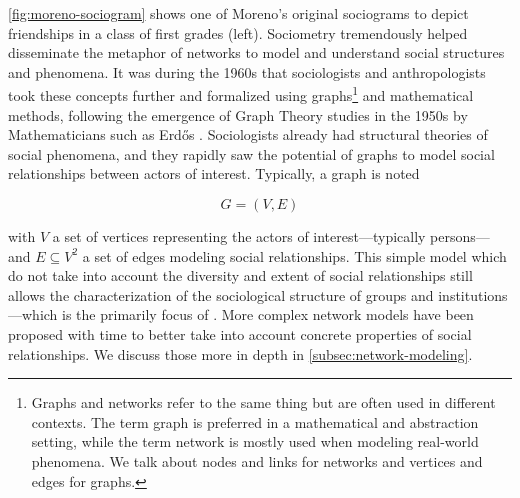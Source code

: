 \autoref{fig:moreno-sociogram} shows one of Moreno's original sociograms to depict friendships in a class of first grades (left).
Sociometry tremendously helped disseminate the metaphor of networks to model and understand social structures and phenomena.
It was during the 1960s that sociologists and anthropologists took these concepts further and formalized \sna using graphs\footnote{Graphs and networks refer to the same thing but are often used in different contexts. The term graph is preferred in a mathematical and abstraction setting, while the term network is mostly used when modeling real-world phenomena. We talk about nodes and links for networks and vertices and edges for graphs.} and mathematical methods\cite{cConceptUseSocial1969, freemanDevelopmentSocialNetwork2004}, following the emergence of Graph Theory studies in the 1950s by Mathematicians such as Erd\H{o}s \cite{erdos2011}.
Sociologists already had structural theories of social phenomena, and they rapidly saw the potential of graphs to model social relationships between actors of interest.
Typically, a graph is noted

\begin{equation}
    G = (V, E)\label{eq:graph}
\end{equation}

with $V$ a set of vertices representing the actors of interest---typically persons---and $E \subseteq V^2$ a set of edges modeling social relationships.
This simple model which do not take into account the diversity and extent of social relationships still allows the characterization of the sociological structure of groups and institutions---which is the primarily focus of \sna\cite{scottSocialNetworkAnalysis1988, freemanDevelopmentSocialNetwork2004}.
More complex network models have been proposed with time to better take into account concrete properties of social relationships.
We discuss those more in depth in \autoref{subsec:network-modeling}.



